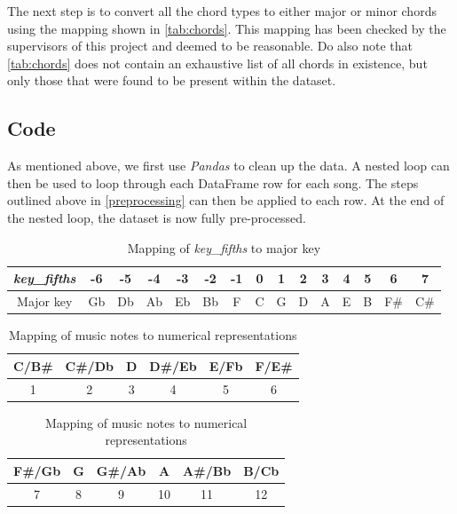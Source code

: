 The next step is to convert all the chord types to either major or minor chords using the mapping shown in \cref{tab:chords}. This mapping has been checked by the supervisors of this project and deemed to be reasonable. Do also note that \cref{tab:chords} does not contain an exhaustive list of all chords in existence, but only those that were found to be present within the dataset.

\subsection{Code}
As mentioned above, we first use \emph{Pandas} to clean up the data. A nested loop can then be used to loop through each DataFrame row for each song. The steps outlined above in \cref{preprocessing} can then be applied to each row. At the end of the nested loop, the dataset is now fully pre-processed.


    \begin{table}
        \caption{Mapping of \emph{key\_fifths} to major key}
        \label{tab:kf_map}
        \centering
        \begin{tabular}{|c||c|c|c|c|c|c|c|c|c|c|c|c|c|c|}
        \hline
        \emph{key\_fifths} & -6 & -5 & -4 & -3 & -2 & -1 & 0 & 1 & 2 & 3 & 4 & 5 & 6 & 7 \\
        \hline
        Major key & Gb & Db & Ab & Eb & Bb & F & C & G & D & A & E & B & F\# & C\# \\
        \hline
        \end{tabular}
        \end{table}

\begin{table}
    \caption{Mapping of music notes to numerical representations}
    \label{tab:note_map}
    \centering
    \begin{tabular}{|c|c|c|c|c|c|}
    \hline
    C/B\# & C\#/Db & D & D\#/Eb & E/Fb & F/E\# \\
    \hline
    1 & 2 & 3 & 4 & 5 & 6 \\
    \hline
    \end{tabular}
    \begin{tabular}{|c|c|c|c|c|c|}
        \hline
    F\#/Gb & G & G\#/Ab & A & A\#/Bb & B/Cb\\
    \hline
    7 & 8 & 9 & 10 & 11 & 12\\
    \hline
    \end{tabular}
    \end{table}

